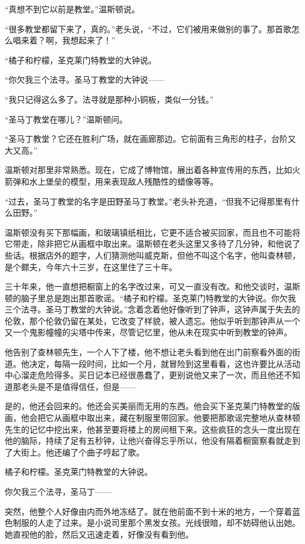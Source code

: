 ``真想不到它以前是教堂。''温斯顿说。

``很多教堂都留下来了，真的。''老头说，``不过，它们被用来做别的事了。那首歌怎么唱来着？啊，我想起来了！''

``橘子和柠檬，圣克莱门特教堂的大钟说。

``你欠我三个法寻。圣马丁教堂的大钟说------

``我只记得这么多了。法寻就是那种小铜板，类似一分钱。''

``圣马丁教堂在哪儿？''温斯顿问。

``圣马丁教堂？它还在胜利广场，就在画廊那边。它前面有三角形的柱子，台阶又大又高。''

温斯顿对那里非常熟悉。现在，它成了博物馆，展出着各种宣传用的东西，比如火箭弹和水上堡垒的模型，用来表现敌人残酷性的蜡像等等。

``过去，圣马丁教堂的名字是田野圣马丁教堂。''老头补充道，``但我不记得那里有什么田野。''

温斯顿没有买下那幅画，和玻璃镇纸相比，它更不适合被买回家，而且也不可能将它带走，除非把它从画框中取出来。温斯顿在老头这里又多待了几分钟，和他说了些话。根据店外的题字，人们猜测他叫威克斯，但他不叫这个名字，他叫查林顿，是个鳏夫，今年六十三岁，在这里住了三十年。

三十年来，他一直想把橱窗上的名字改过来，可又一直没有改。和他交谈时，温斯顿的脑子里总是跑出那首歌谣。``橘子和柠檬。圣克莱门特教堂的大钟说。你欠我三个法寻。圣马丁教堂的大钟说。''念着念着他好像听到了钟声，这钟声属于失去的伦敦，那个伦敦仍留在某处，它改变了样貌，被人遗忘。他似乎听到那钟声从一个又一个鬼影幢幢的尖塔中传来，尽管记忆里，他从未在现实中听到教堂的钟声。

他告别了查林顿先生，一个人下了楼，他不想让老头看到他在出门前察看外面的街道。他决定，每隔一段时间，比如一个月，就冒险到这里看看，这也许要比从活动中心溜走危险得多。买日记本已经很愚蠢了，更别说他又来了一次，而且他还不知道那老头是不是值得信任，但是------

是的，他还会回来的。他还会买美丽而无用的东西。他会买下圣克莱门特教堂的版画，他会把它从画框中取出来，藏在制服里带回家。他要把那歌谣完整地从查林顿先生的记忆中挖出来，他甚至要将楼上的房间租下来。这些疯狂的念头一度出现在他的脑际，持续了足有五秒钟，让他兴奋得忘乎所以，他没有隔着橱窗察看就走到了大街上。他还编了个曲子哼起了歌。

橘子和柠檬。圣克莱门特教堂的大钟说。

你欠我三个法寻，圣马丁------

突然，他整个人好像由内而外地冻结了。就在他前面不到十米的地方，一个穿着蓝色制服的人走了过来。是小说司里那个黑发女孩。光线很暗，却不妨碍他认出她。她直视他的脸，然后又迅速走着，好像没有看到他。

